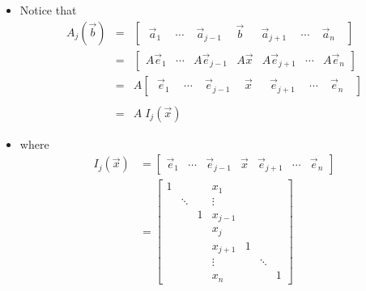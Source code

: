 \documentclass[pdf,9pt]{beamer}
\begin{document}
\begin{frame}[fragile]
\begin{proofnoend}
    \begin{itemize}
        \item
	Notice that
	\begin{eqnarray*}
	A_j(\vec{b}) & = & \left[ \begin{array}{ccccccc} \; \vec{a}_1 & \;\, \cdots & \; \vec{a}_{j-1} & \;\,\vec{b} & \;\;\, \vec{a}_{j+1} & \;\, \cdots & \;\vec{a}_n  \;\,\, \end{array} \right] \\
	& = &  \left[ \begin{array}{ccccccc} A\vec{e}_1 & \cdots & A\vec{e}_{j-1} & A\vec{x} & A\vec{e}_{j+1} & \cdots & A\vec{e}_n \end{array} \right] \\
	& = & \!\!\!\!\! A  \left[ \begin{array}{ccccccc} \; \vec{e}_1 & \;\, \cdots & \; \vec{e}_{j-1} & \;\,\vec{x} & \;\;\, \vec{e}_{j+1} & \;\, \cdots & \;\vec{e}_n  \;\,\, \end{array} \right] \\
	& & \\
	& = & \!\!\!\!\! A \; I_j(\vec{x})
	\end{eqnarray*}
    \pause
    \vspace{-1em}
    \item[] where
    \begin{align*}
	I_j(\vec{x}) &= \left[ \begin{array}{ccccccc}
	\vec{e}_1 & \cdots & \vec{e}_{j-1} & \vec{x} & \vec{e}_{j+1} & \cdots & \vec{e}_n \end{array} \right] \\
	&
	=
	\left[ \begin{array}{ccccccc}
	1 &  & & x_1 & & & \\ & \ddots & & \vdots & & & \\ & & 1 & x_{j-1} & & & \\
	& & & x_{j} & & & \\ & & & x_{j+1} & 1 & & \\ & & & \vdots & & \ddots & \\ & & & x_n & & & 1
	\end{array} \right]
    \end{align*}
    \end{itemize}
\end{proofnoend}
\end{frame}
\end{document}
